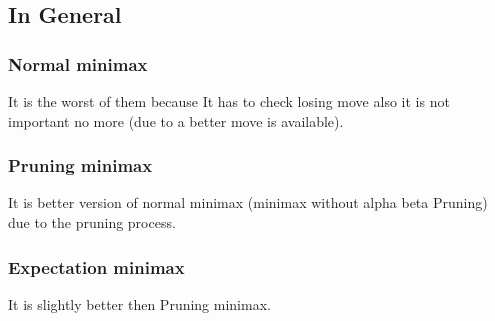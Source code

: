 \documentclass{article}
\begin{document}
\subsection*{In General}
\subsubsection*{Normal minimax}
It is the worst of them because It has to check losing move also it is not important no more (due to a better move is available).
\subsubsection*{Pruning minimax}
It is better version of normal minimax (minimax without alpha beta Pruning) due to the pruning process.
\subsubsection*{Expectation minimax}
It is slightly better then Pruning minimax.
\end{document}
